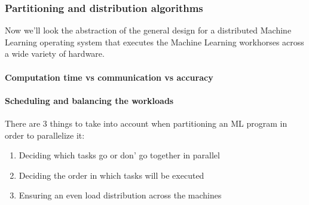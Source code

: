 

\subsubsection{Partitioning and distribution algorithms}
Now we'll look the abstraction of the general design for a distributed Machine Learning operating system that executes the Machine Learning workhorses across a wide variety of hardware.


\paragraph{Computation time vs communication vs accuracy}


\paragraph{Scheduling and balancing the workloads}
There are 3 things to take into account when partitioning an ML program in order to parallelize it:\cite{Xing16}\\
\begin{enumerate}
	\item Deciding which tasks go or don' go together in parallel
	\item Deciding the order in which tasks will be executed
	\item Ensuring an even load distribution across the machines
\end{enumerate}


